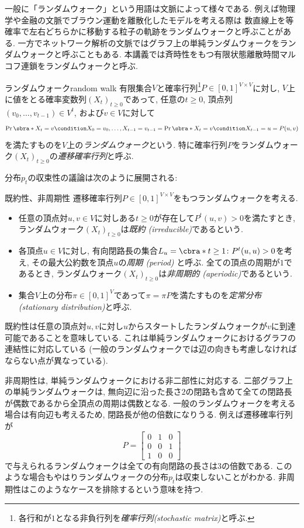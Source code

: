   一般に「ランダムウォーク」という用語は文脈によって様々である.
  例えば物理学や金融の文脈でブラウン運動を離散化したモデルを考える際は
    数直線上を等確率で左右どちらかに移動する粒子の軌跡をランダムウォークと呼ぶことがある.
  一方でネットワーク解析の文脈ではグラフ上の単純ランダムウォークをランダムウォークと呼ぶこともある.
  本講義では斉時性をもつ有限状態離散時間マルコフ連鎖をランダムウォークと呼ぶ.
  \begin{definition}{ランダムウォーク}{random walk}
    有限集合$V$と確率行列\footnote{各行和が$1$となる非負行列を\emph{確率行列(stochastic matrix)}と呼ぶ.}$P\in[0,1]^{V\times V}$に対し,
    $V$上に値をとる確率変数列$(X_t)_{t\ge 0}$であって, 任意の$t\ge 0$, 頂点列$(v_0,\dots,v_{t-1})\in V^t$,
    および$v\in V$に対して
    \[
      \Pr\sbra*{X_t = v \condition X_0 = v_0,\dots,X_{t-1} = v_{t-1}} = \Pr\sbra*{X_t = v \condition X_{t-1} = u} = P(u,v)
    \]
    を満たすものを$V$上の\emph{ランダムウォーク}という.
    特に確率行列$P$をランダムウォーク$(X_t)_{t\ge 0}$の\emph{遷移確率行列}と呼ぶ.
  \end{definition}
  分布$p_t$の収束性の議論は次のように展開される:
  \begin{definition}{既約性、非周期性}{}
    遷移確率行列$P \in [0,1]^{V\times V}$をもつランダムウォークを考える.
    \begin{itemize}
    \item 任意の頂点対$u,v\in V$に対しある$t \ge 0$が存在して$P^t(u,v)>0$を満たすとき, ランダムウォーク$(X_t)_{t\ge 0}$は\emph{既約 (irreducible)}であるという.
    \item 各頂点$u\in V$に対し, 有向閉路長の集合$L_u = \cbra*{ t \ge 1 \colon P^t(u,u) > 0}$を考え, その最大公約数を頂点$u$の\emph{周期 (period)} と呼ぶ. 全ての頂点の周期が$1$であるとき, ランダムウォーク$(X_t)_{t\ge 0}$は\emph{非周期的 (aperiodic)}であるという.
    \item 集合$V$上の分布$\pi\in[0,1]^V$であって$\pi = \pi P$を満たすものを\emph{定常分布 (stationary distribution)}と呼ぶ.
    \end{itemize}
  \end{definition}
%
  既約性は任意の頂点対$u,v$に対し$u$からスタートしたランダムウォークが$v$に到達可能であることを意味している.
  これは単純ランダムウォークにおけるグラフの連結性に対応している
    (一般のランダムウォークでは辺の向きも考慮しなければならない点が異なっている).

  非周期性は, 単純ランダムウォークにおける非二部性に対応する.
  二部グラフ上の単純ランダムウォークは, 無向辺に沿った長さ$2$の閉路も含めて全ての閉路長が偶数であるから全頂点の周期は偶数となる.
  一般のランダムウォークを考える場合は有向辺も考えるため, 閉路長が他の倍数になりうる.
  例えば遷移確率行列が
  \[
    P = \begin{bmatrix}
      0 & 1 & 0 \\
      0 & 0 & 1 \\
      1 & 0 & 0
    \end{bmatrix}
  \]
  で与えられるランダムウォークは全ての有向閉路の長さは$3$の倍数である.
  このような場合もやはりランダムウォークの分布$p_t$は収束しないことがわかる.
  非周期性はこのようなケースを排除するという意味を持つ.

